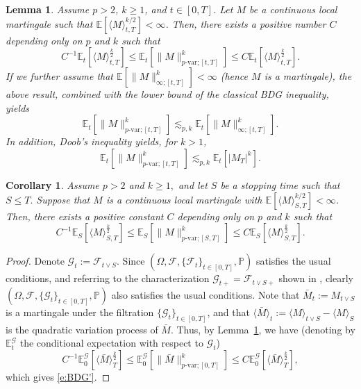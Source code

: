 \documentclass[11pt,reqno]{amsart}
\def\E{\mathbb E}
\newtheorem{lemma}{Lemma}[section]
\newtheorem{corollary}{Corollary}[section]
\numberwithin{equation}{section}
\begin{document}
\begin{lemma}\label{lem:BDG}
Assume $p>2$, $k\ge 1$, and $t\in[0,T]$. Let $M$ be a continuous local martingale such that $\E[\langle M\rangle_{t,T}^{k/2}]<\infty$.  Then, there exists a positive number $C$ depending only on $p$ and $k$ such that
\[C^{-1}\E_{t}[\langle M\rangle_{t,T}^{\frac k2}]\le \mathbb{E}_{t}[\|M\|^{k}_{p\text{-}\mathrm{var};[t,T]}] \le C\E_{t}[\langle M\rangle_{t,T}^{\frac k2}].\]
If we further assume that $\mathbb{E}[\|M\|^{k}_{\infty;[t,T]}]<\infty$ (hence $M$ is a martingale), the above result, combined with the lower bound of the classical BDG inequality, yields 
\[\mathbb{E}_{t}[\|M\|^{k}_{p\text{-}\mathrm{var};[t,T]}] \lesssim_{p,k} \mathbb{E}_{t}[\|M\|^{k}_{\infty;[t,T]}].\]
In addition, Doob's inequality yields, for $k>1$,
\[\mathbb{E}_{t}[\|M\|^{k}_{p\text{-}\mathrm{var};[t,T]}] \lesssim_{p,k} \mathbb{E}_{t}[|M_T|^{k}].\]
\end{lemma}


\begin{corollary}\label{cor:BDG'}
Assume $p>2$ and $k\ge 1,$ and let $S$ be a stopping time such that $S\le T.$ Suppose that $M$ is a continuous local martingale with $\E[\langle M\rangle_{S,T}^{k/2}]<\infty$. Then, there exists a positive constant $C$ depending only on $p$ and $k$ such that
\begin{equation}\label{e:BDG'}
C^{-1}\mathbb{E}_{S}[\langle M\rangle_{S,T}^{\frac{k}{2}}]\le \mathbb{E}_{S}[\|M\|^{k}_{p\text{-}\mathrm{var};[S,T]}] \le C\mathbb{E}_{S}[\langle M\rangle_{S,T}^{\frac{k}{2}}].
\end{equation}
\end{corollary}
\begin{proof}
Denote $\mathcal{G}_{t}:=\mathcal{F}_{t\vee S}.$ Since $(\Omega,\mathcal{F},\{\mathcal{F}_{t}\}_{t\in[0,T]},\mathbb{P})$ satisfies the usual conditions, and referring to the characterization $\mathcal{G}_{t+} = \mathcal{F}_{t\vee S+}$ shown in \cite[IV-56 (d)]{dellacherie2011probabilities}, clearly $(\Omega,\mathcal{F},\{\mathcal{G}_{t}\}_{t\in[0,T]},\mathbb{P})$ also satisfies the usual conditions. Note that $\bar{M}_{t}:=M_{t\vee S}$ is a martingale under the filtration $\{\mathcal{G}_{t}\}_{t\in[0,T]}$, and that $\langle \bar{M} \rangle_{t} := \langle M\rangle_{t\vee S} - \langle M\rangle_{S}$ is the quadratic variation process of $\bar{M}$. Thus, by Lemma~\ref{lem:BDG}, we have (denoting by $\mathbb{E}^{\mathcal{G}}_{t}$ the conditional expectation with respect to $\mathcal{G}_{t}$)
\begin{equation*}
C^{-1}\mathbb{E}^{\mathcal{G}}_{0}[\langle \bar{M}\rangle_{T}^{\frac{k}{2}}]\le \mathbb{E}^{\mathcal{G}}_{0}[\|\bar{M}\|^{k}_{p\text{-var};[0,T]}] \le C\mathbb{E}^{\mathcal{G}}_{0}[\langle \bar{M}\rangle_{T}^{\frac{k}{2}}],
\end{equation*}
which gives \eqref{e:BDG'}.
\end{proof}
\end{document}
